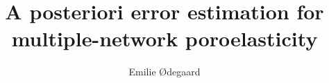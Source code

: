 \documentclass[a4paper, 11.5pt]{memoir}
\title{A posteriori error estimation for multiple-network poroelasticity}
\author{Emilie Ødegaard}
\begin{document}
	\masterfrontpage
    \frontmatter        %
	
	
	
    \tableofcontents    %

    \mainmatter         %

	
	
	
	
	
	
    \backmatter         %
    \printbibliography
\end{document}
